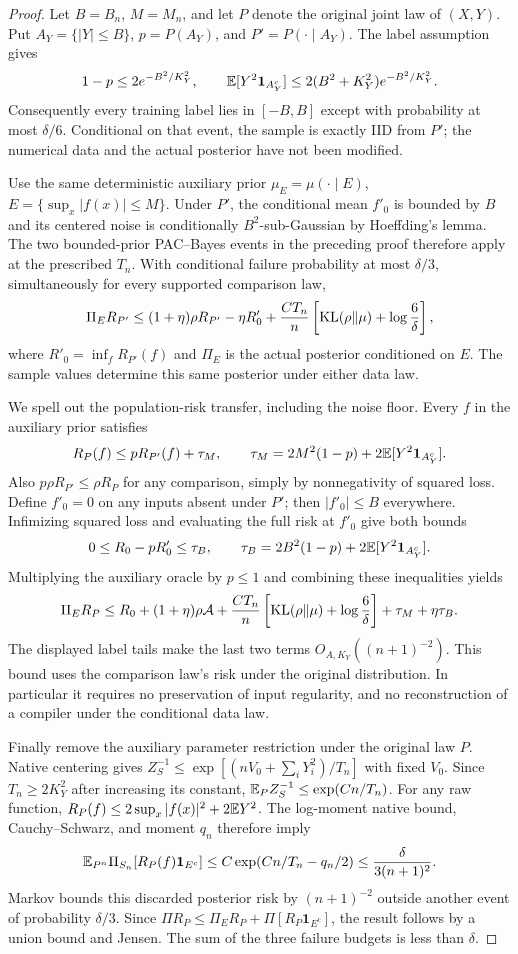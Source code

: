 \begin{proof}
Let $B=B_n$, $M=M_n$, and let $P$ denote the original joint law of
$(X,Y)$. Put $A_Y=\{|Y|\le B\}$, $p=P(A_Y)$, and
$P'=P(\cdot\mid A_Y)$. The label assumption gives
\[
 1-p\le2e^{-B^2/K_Y^2},\qquad
 \mathbb E[Y^2\mathbf1_{A_Y^c}]
       \le2(B^2+K_Y^2)e^{-B^2/K_Y^2}.
 \label{eq:asinh-label-tail-hp}
\]
Consequently every training label lies in $[-B,B]$ except with
probability at most $\delta/6$. Conditional on that event, the
sample is exactly IID from $P'$; the numerical data and the actual
posterior have not been modified.

Use the same deterministic auxiliary prior
$\mu_E=\mu(\cdot\mid E)$, $E=\{\sup_x|f(x)|\le M\}$.
Under $P'$, the conditional mean $f'_0$ is bounded by $B$ and its
centered noise is conditionally $B^2$-sub-Gaussian by Hoeffding's
lemma. The two bounded-prior PAC--Bayes events in the preceding proof
therefore apply at the prescribed $T_n$. With conditional failure
probability at most $\delta/3$, simultaneously for every supported
comparison law,
\[
 \Pi_E R_{P'}
 \le (1+\eta)\rho R_{P'}-\eta R'_0
       +\frac{CT_n}{n}
             \left[\operatorname{KL}(\rho\|\mu)+\log\frac6\delta\right],
\]
where $R'_0=\inf_f R_{P'}(f)$ and $\Pi_E$ is the actual posterior
conditioned on $E$. The sample values determine this same posterior
under either data law.

We spell out the population-risk transfer, including the noise floor.
Every $f$ in the auxiliary prior satisfies
\[
 R_P(f)\le pR_{P'}(f)+\tau_M,\qquad
 \tau_M=2M^2(1-p)+2\mathbb E[Y^2\mathbf1_{A_Y^c}].
\]
Also $p\rho R_{P'}\le\rho R_P$ for any comparison, simply by
nonnegativity of squared loss. Define $f'_0=0$ on any inputs absent
under $P'$; then $|f'_0|\le B$ everywhere. Infimizing squared loss
and evaluating the full risk at $f'_0$ give both bounds
\[
 0\le R_0-pR'_0\le\tau_B,
 \qquad \tau_B=2B^2(1-p)+2\mathbb E[Y^2\mathbf1_{A_Y^c}].
\]
Multiplying the auxiliary oracle by $p\le1$ and combining these
inequalities yields
\[
 \Pi_E R_P\le R_0+(1+\eta)\rho\mathcal A
     +\frac{CT_n}{n}\left[\operatorname{KL}(\rho\|\mu)+\log\frac6\delta\right]
     +\tau_M+\eta\tau_B.
\]
The displayed label tails make the last two terms
$O_{A,K_Y}((n+1)^{-2})$. This bound uses the comparison law's risk
under the original distribution. In particular it requires no
preservation of input regularity, and no reconstruction of a compiler
under the conditional data law.

Finally remove the auxiliary parameter restriction under the original
law $P$. Native centering gives
$Z_S^{-1}\le\exp[(nV_0+\sum_iY_i^2)/T_n]$ with fixed $V_0$.
Since $T_n\ge2K_Y^2$ after increasing its constant,
$\mathbb E_P Z_S^{-1}\le\exp(Cn/T_n)$.
For any raw function,
$R_P(f)\le2\sup_x|f(x)|^2+2\mathbb E Y^2$.
The log-moment native bound, Cauchy--Schwarz, and moment $q_n$
therefore imply
\[
 \mathbb E_{P^n}\Pi_{S_n}[R_P(f)\mathbf1_{E^c}]
       \le C\exp(Cn/T_n-q_n/2)
       \le\frac{\delta}{3(n+1)^2}.
\]
Markov bounds this discarded posterior risk by $(n+1)^{-2}$
outside another event of probability $\delta/3$.
Since
$\Pi R_P\le\Pi_E R_P+\Pi[R_P\mathbf1_{E^c}]$,
the result follows by a union bound and Jensen. The sum of the three
failure budgets is less than $\delta$.
\end{proof}

